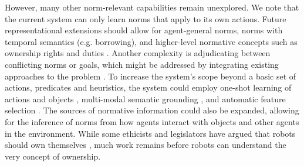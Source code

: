 \documentclass[letterpaper]{article} %
\begin{document}
However, many other norm-relevant capabilities remain unexplored. We note that the current system can only learn norms that apply to its own actions. Future representational extensions should allow for agent-general norms, norms with temporal semantics (e.g. borrowing), and higher-level normative concepts such as ownership rights and duties \cite{mccarty2002ownership}. Another complexity is adjudicating between conflicting norms or goals, which might be addressed by integrating existing approaches to the problem \cite{kasenberg2018norm,vasconcelos2009normative}. To increase the system's scope beyond a basic set of actions, predicates and heuristics, the system could employ one-shot learning of actions and objects \cite{scheutz2017spoken}, multi-modal semantic grounding \cite{thomason2016learning}, and automatic feature selection \cite{abe2010feature}. The sources of normative information could also be expanded, allowing for the inference of norms from how agents interact with objects and other agents in the environment. While some ethicists and legislators have argued that robots should own themselves \cite{turner2019legal}, much work remains before robots can understand the very concept of ownership.

\fontsize{9.5pt}{10.5pt} \selectfont


\end{document}
